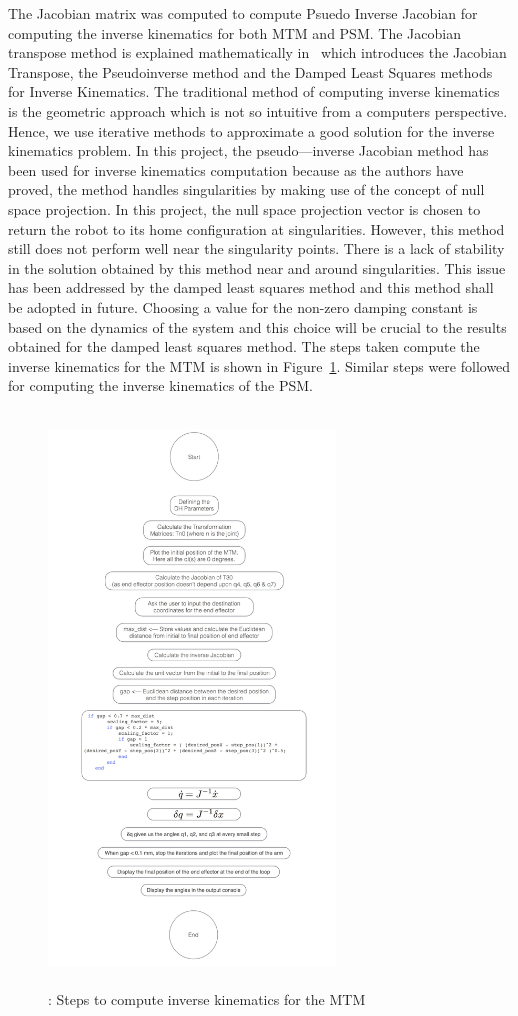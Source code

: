 \documentclass[10pt,journal,compsoc]{IEEEtran}
\begin{document}
The Jacobian matrix was computed to compute Psuedo Inverse Jacobian for computing the inverse kinematics for both MTM and PSM. The Jacobian transpose method is explained mathematically in~\cite{buss2004} which introduces the Jacobian Transpose, the Pseudoinverse method and the Damped Least Squares methods for Inverse Kinematics. The traditional method of computing inverse kinematics is the geometric approach which is not so intuitive from a computer\textquotesingle s perspective. Hence, we use iterative methods to approximate a good solution for the inverse kinematics problem. In this project, the pseudo---inverse Jacobian method has been used for inverse kinematics computation because as the authors have proved, the method handles singularities by making use of the concept of null space projection. In this project, the null space projection vector is chosen to return the robot to its home configuration at singularities. However, this method still does not perform well near the singularity points. There is a lack of stability in the solution obtained by this method near and around singularities. This issue has been addressed by the damped least squares method and this method shall be adopted in future. Choosing a value for the non-zero damping constant is based on the dynamics of the system and this choice will be crucial to the results obtained for the damped least squares method. The steps taken compute the inverse kinematics for the MTM is shown in Figure~\ref{fig:logicmtm}. Similar steps were followed for computing the inverse kinematics of the PSM.

\begin{figure}[htbp]
\begin{center}
\includegraphics[width=3in, height=6in]{logicmtm.jpg}
\caption{: Steps to compute inverse kinematics for the MTM}
\label{fig:logicmtm}
\end{center}
\end{figure}
\end{document}
